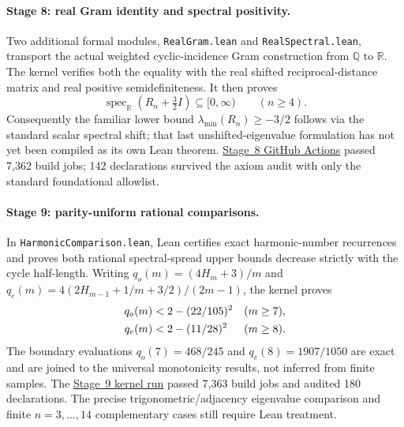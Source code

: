 \paragraph{Stage 8: real Gram identity and spectral positivity.}
Two additional formal modules, \texttt{RealGram.lean} and
\texttt{RealSpectral.lean}, transport the actual weighted
cyclic-incidence Gram construction from $\mathbb Q$ to
$\mathbb R$. The kernel verifies both the equality with the
real shifted reciprocal-distance matrix and real positive
semidefiniteness. It then proves
\begin{equation}\label{eq:lean-spectrum}
\operatorname{spec}_{\mathbb R}(R_n+\tfrac32 I)
\subseteq[0,\infty)\qquad(n\ge4).
\end{equation}
Consequently the familiar lower bound
$\lambda_{\min}(R_n)\ge-3/2$ follows via the standard scalar
spectral shift; that last unshifted-eigenvalue formulation has
not yet been compiled as its own Lean theorem.
\href{https://github.com/tonynewton79-web/newton-400-conjectures/actions/runs/39139083900}{Stage~8 GitHub Actions}
passed 7,362 build jobs; 142 declarations survived the axiom
audit with only the standard foundational allowlist.


\paragraph{Stage 9: parity-uniform rational comparisons.}
In \texttt{HarmonicComparison.lean}, Lean certifies exact
harmonic-number recurrences and proves both rational spectral-spread
upper bounds decrease strictly with the cycle half-length.
Writing $q_o(m)=(4H_m+3)/m$ and
$q_e(m)=4(2H_{m-1}+1/m+3/2)/(2m-1)$, the kernel proves
\begin{align}\label{eq:lean-parity-bounds}
q_o(m)&<2-(22/105)^2 &&(m\ge7),\notag\\
q_e(m)&<2-(11/28)^2 &&(m\ge8).
\end{align}
The boundary evaluations $q_o(7)=468/245$ and
$q_e(8)=1907/1050$ are exact and are joined to the
universal monotonicity results, not inferred from finite samples.
The \href{https://github.com/tonynewton79-web/newton-400-conjectures/actions/runs/39140710038}{Stage~9 kernel run}
passed 7,363 build jobs and audited 180 declarations.
The precise trigonometric/adjacency eigenvalue comparison and finite
$n=3,\ldots,14$ complementary cases still require Lean treatment.


